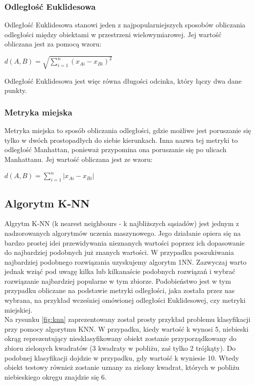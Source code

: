 \documentclass{article}
\begin{document}
\subsubsection{Odległość Euklidesowa}
Odległość Euklidesowa stanowi jeden z najpopularniejszych sposobów obliczania odległości między obiektami w przestrzeni wielowymiarowej. Jej wartość obliczana jest za pomocą wzoru:\\
\begin{center}
    $d(A,B) = \sqrt{\sum_{i=1}^n(x_{Ai} - x_{Bi})^2}$
\end{center}{}
Odległość Euklidesowa jest więc równa długości odcinka, który łączy dwa dane punkty.

\subsubsection{Metryka miejska}
Metryka miejska to sposób obliczania odległości, gdzie możliwe jest poruszanie się tylko w dwóch prostopadłych do siebie kierunkach. Inna nazwa tej metryki to odległość Manhattan, ponieważ przypomina ona poruszanie się po ulicach Manhattanu. Jej wartość obliczana jest ze wzoru:\\
\begin{center}{}
    $d(A,B) = \sum_{i=1}^n|x_{Ai} - x_{Bi}|$
\end{center}

\newpage

\subsection{Algorytm K-NN}
Algrytm K-NN (k nearest neighbours - k najbliższych sąsiadów) jest jednym z nadzorowanych algorytmów uczenia maszynowego. Jego działanie opiera się na bardzo prostej idei przewidywania nieznanych wartości poprzez ich dopasowanie do najbardziej podobnych już znanych wartości. W przypadku poszukiwania najbardziej podobnego rozwiązania uzyskujemy algorytm 1NN. Zazwyczaj warto jednak wziąć pod uwagę kilka lub kilkanaście podobnych rozwiązań i wybrać rozwiązanie najbardziej popularne w tym zbiorze. Podobieństwo jest w tym przypadku obliczane na podstawie metryki odległości, jaka została przez nas wybrana, na przykład wcześniej omówionej odległości Euklidesowej, czy metryki miejskiej.\\

Na rysunku \ref{fig:knn} zaprezentowany został prosty przykład problemu klasyfikacji przy pomocy algorytmu KNN. W przypadku, kiedy wartość k wynosi 5, niebieski okrąg reprezentujący niesklasyfikowany obiekt zostanie przyporządkowany do zbioru zielonych kwadratów (3 kwadraty w pobliżu, zaś tylko 2 trójkąty). Do podobnej klasyfikacji dojdzie w przypadku, gdy wartość k wyniesie 10. Wtedy obiekt testowy również zostanie uznany za zielony kwadrat, których w pobliżu niebieskiego okręgu znajdzie się 6.
\end{document}
